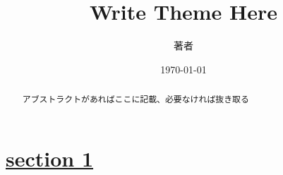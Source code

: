 \documentclass[a4paper,11pt]{ltjsarticle}
\title{\bfseries Write Theme Here}
\author{著者}
\date{\today}
\newcommand{\sectionlink}[1]{\section[#1]{\hyperlink{toc}{#1}}}
\numberwithin{equation}{section}
\begin{document}
\maketitle

\begin{abstract}
アブストラクトがあればここに記載、必要なければ抜き取る
\end{abstract}


\hypertarget{toc}{}
\tableofcontents
\clearpage

\sectionlink{section 1}
\end{document}
